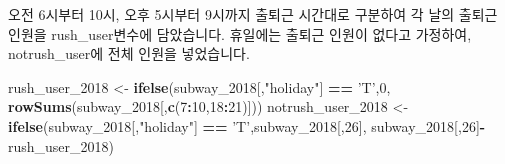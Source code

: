 \documentclass[]{article}
\newenvironment{Shaded}{\begin{snugshade}}{\end{snugshade}}
\newcommand{\KeywordTok}[1]{\textcolor[rgb]{0.13,0.29,0.53}{\textbf{#1}}}
\newcommand{\DecValTok}[1]{\textcolor[rgb]{0.00,0.00,0.81}{#1}}
\newcommand{\StringTok}[1]{\textcolor[rgb]{0.31,0.60,0.02}{#1}}
\newcommand{\OperatorTok}[1]{\textcolor[rgb]{0.81,0.36,0.00}{\textbf{#1}}}
\newcommand{\NormalTok}[1]{#1}
\begin{document}
\begin{Shaded}
\end{Shaded}

오전 6시부터 10시, 오후 5시부터 9시까지 출퇴근 시간대로 구분하여 각 날의
출퇴근 인원을 rush\_user변수에 담았습니다. 휴일에는 출퇴근 인원이 없다고
가정하여, notrush\_user에 전체 인원을 넣었습니다.

\begin{Shaded}
\begin{Highlighting}[]
\NormalTok{rush_user_}\DecValTok{2018}\NormalTok{ <-}\StringTok{ }\KeywordTok{ifelse}\NormalTok{(subway_}\DecValTok{2018}\NormalTok{[,}\StringTok{"holiday"}\NormalTok{] }\OperatorTok{==}\StringTok{ 'T'}\NormalTok{,}\DecValTok{0}\NormalTok{, }\KeywordTok{rowSums}\NormalTok{(subway_}\DecValTok{2018}\NormalTok{[,}\KeywordTok{c}\NormalTok{(}\DecValTok{7}\OperatorTok{:}\DecValTok{10}\NormalTok{,}\DecValTok{18}\OperatorTok{:}\DecValTok{21}\NormalTok{)]))}
\NormalTok{notrush_user_}\DecValTok{2018}\NormalTok{ <-}\StringTok{ }\KeywordTok{ifelse}\NormalTok{(subway_}\DecValTok{2018}\NormalTok{[,}\StringTok{"holiday"}\NormalTok{] }\OperatorTok{==}\StringTok{ 'T'}\NormalTok{,subway_}\DecValTok{2018}\NormalTok{[,}\DecValTok{26}\NormalTok{], subway_}\DecValTok{2018}\NormalTok{[,}\DecValTok{26}\NormalTok{]}\OperatorTok{-}\NormalTok{rush_user_}\DecValTok{2018}\NormalTok{)}
\end{Highlighting}
\end{Shaded}
\end{document}
